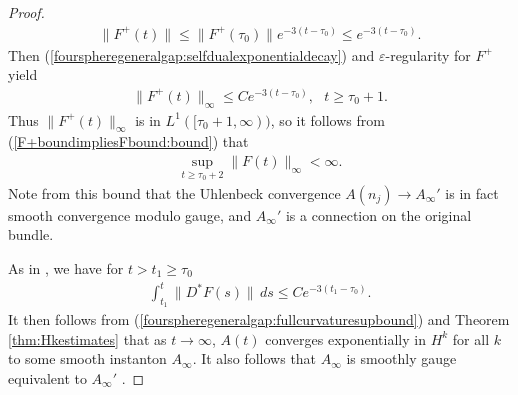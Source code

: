 \documentclass[12pt]{amsart}
\renewcommand{\1}{{\mathbf 1}}
\theoremstyle{others}
\numberwithin{equation}{section}
\begin{document}
\begin{proof}
    \begin{align}\label{fourspheregeneralgap:selfdualexponentialdecay}
        \|F^+(t)\| \leq \|F^+(\tau_0)\|e^{-3(t - \tau_0)} \leq e^{-3(t-\tau_0)}.
    \end{align} Then  (\ref{fourspheregeneralgap:selfdualexponentialdecay}) and $\varepsilon$-regularity for \(F^+\) yield
    \begin{align}\label{fourspheregeneralgap:F+exponentialdecay}
        \|F^+(t)\|_\infty \leq Ce^{-3(t-\tau_0)}, \ \ \ t \geq \tau_0 + 1.
    \end{align} Thus \(\|F^+(t)\|_\infty\) is in \(L^1([\tau_0 + 1, \infty))\), so it follows from (\ref{F+boundimpliesFbound:bound}) that
    \begin{align}\label{fourspheregeneralgap:fullcurvaturesupbound}
        \sup_{t \geq \tau_0 + 2} \|F(t)\|_\infty < \infty.
    \end{align}Note from this bound that the Uhlenbeck convergence \(A(n_j) \to A_\infty'\) is in fact smooth convergence modulo gauge, and \(A_\infty'\) is a connection on the original bundle.

    As in \cite[Theorem 3.7]{instantons}, we have for \(t > t_1 \geq \tau_0\)
    \begin{align}\label{fourspheregeneralgap:rhosmall}
        \int_{t_1}^t \|D^\ast F(s)\| \, ds \leq Ce^{-3(t_1 - \tau_0)}.
    \end{align} It then follows from (\ref{fourspheregeneralgap:fullcurvaturesupbound}) and Theorem \ref{thm:Hkestimates} that as \(t \to \infty\), \(A(t)\) converges exponentially in \(H^k\) for all \(k\) to some smooth instanton \(A_\infty\). It also follows that \(A_\infty\) is smoothly gauge equivalent to \(A_\infty'\) \cite[.7]{donkron}. \par 

\end{proof}
\end{document}
